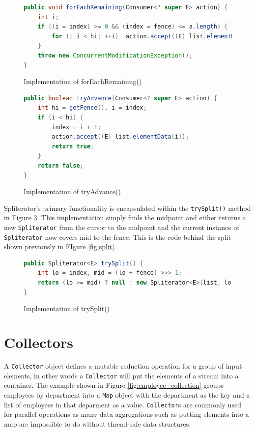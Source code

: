 \documentclass[oneside, a4paper, 11pt]{article}
\begin{document}
\begin{figure}[H]
\begin{lstlisting}[language=Java]
public void forEachRemaining(Consumer<? super E> action) {
    int i;
    if ((i = index) >= 0 && (index = fence) <= a.length) {
        for (; i < hi; ++i)  action.accept((E) list.elementData[i]);
    }
    throw new ConcurrentModificationException();
}
\end{lstlisting}
\caption{Implementation of forEachRemaining()}
\label{fig:forEachRemaining}
\end{figure}

\begin{figure}[H]
\begin{lstlisting}[language=Java]
public boolean tryAdvance(Consumer<? super E> action) {
    int hi = getFence(), i = index;
    if (i < hi) {
        index = i + 1;
        action.accept((E) list.elementData[i]);
        return true;
    }
    return false;
}
\end{lstlisting}
\caption{Implementation of tryAdvance()}
\label{fig:tryAdvance}
\end{figure}

Spliterator's primary functionality is encapsulated within the \verb|trySplit()| method in Figure \ref{fig:trySplit}. This implementation simply finds the midpoint and either returns a new \verb|Spliterator| from the cursor to the midpoint and the current instance of \verb|Spliterator| now covers mid to the fence. This is the code behind the split shown previously in FIgure \ref{fig:split}.

\begin{figure}[H]
\begin{lstlisting}[language=Java]
public Spliterator<E> trySplit() {
    int lo = index, mid = (lo + fence) >>> 1;
    return (lo >= mid) ? null : new Spliterator<E>(list, lo, index = mid);
}
\end{lstlisting}
\caption{Implementation of trySplit()}
\label{fig:trySplit}
\end{figure}

\section{Collectors}
A \verb|Collector| object defines a mutable reduction operation for a group of input elements, in other words a \verb|Collector| will put the elements of a stream into a container. The example shown in Figure \ref{fig:employee_collection} groups employees by department into a \verb|Map| object with the department as the key and a list of employees in that deparment as a value. \verb|Collector|s are commonly used for parallel operations as many data aggregations such as putting elements into a map are impossible to do without thread-safe data structures.
\end{document}
